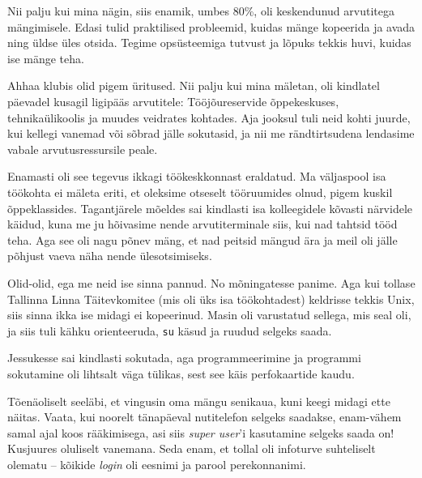 Nii palju kui mina nägin, siis enamik, umbes 80\%, oli keskendunud arvutitega 
mängimisele. Edasi tulid praktilised probleemid, kuidas mänge 
kopeerida ja avada ning üldse üles otsida. Tegime 
opsüsteemiga tutvust ja lõpuks tekkis huvi, kuidas ise mänge teha.


Ahhaa klubis olid pigem üritused. Nii palju kui mina mäletan, oli 
kindlatel päevadel kusagil ligipääs arvutitele: Tööjõureservide õppekeskuses, tehnikaülikoolis ja muudes veidrates 
kohtades. Aja jooksul tuli neid kohti juurde, kui kellegi vanemad või sõbrad 
jälle sokutasid, ja nii me rändtirtsudena lendasime vabale 
arvutusressursile peale.


Enamasti oli see tegevus ikkagi töökeskkonnast eraldatud. Ma väljaspool 
isa töökohta ei mäleta eriti, et oleksime otseselt tööruumides 
olnud, pigem kuskil õppeklassides. Tagantjärele mõeldes sai kindlasti isa kolleegidele kõvasti närvidele käidud, kuna me ju hõivasime nende arvutiterminale siis, kui nad tahtsid tööd teha. Aga 
see oli nagu põnev mäng, et nad peitsid mängud ära ja meil oli 
jälle põhjust vaeva näha nende ülesotsimiseks.


Olid-olid, ega me neid ise sinna pannud. No mõningatesse panime. Aga kui 
tollase Tallinna Linna Täitevkomitee (mis oli üks isa töökohtadest) 
keldrisse tekkis Unix, siis sinna ikka ise midagi ei kopeerinud. Masin 
oli varustatud sellega, mis seal oli, ja siis tuli kähku orienteeruda, 
\verb|su| käsud ja ruudud selgeks saada.


Jessukesse sai kindlasti sokutada, aga programmeerimine 
ja programmi sokutamine oli lihtsalt väga tülikas, sest see käis perfokaartide kaudu.


Tõenäoliselt seeläbi, et 
vingusin oma mängu senikaua, kuni keegi midagi ette näitas. Vaata, kui noorelt
tänapäeval nutitelefon selgeks saadakse, enam-vähem samal ajal koos 
rääkimisega, asi siis \emph{super user}'i kasutamine selgeks saada 
on! Kusjuures oluliselt vanemana. Seda enam, et tollal oli infoturve 
suhteliselt olematu -- kõikide \emph{login} oli eesnimi ja parool 
perekonnanimi.

